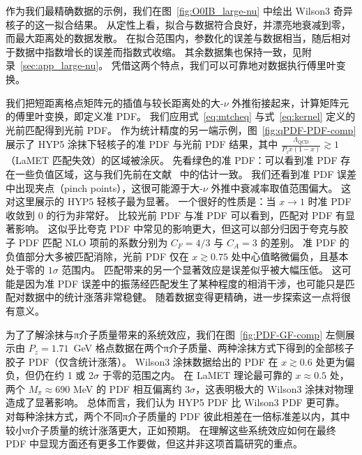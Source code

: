 作为我们最精确数据的示例，我们在图~\ref{fig:O0IB_large-nu} 中绘出 Wilson3 奇异核子的这一拟合结果。
从定性上看，拟合与数据符合良好，并漂亮地衰减到零，而最大距离处的数据发散。
在拟合范围内，参数化的误差与数据相当，随后相对于数据中指数增长的误差而指数式收缩。
其余数据集也保持一致，见附录~\ref{sec:app_large-nu}。
凭借这两个特点，我们可以可靠地对数据执行傅里叶变换。

我们把短距离格点矩阵元的插值与较长距离处的大-$\nu$ 外推衔接起来，计算矩阵元的傅里叶变换，即定义准 PDF。
我们应用式~\ref{eq:mtcheq} 与式~\ref{eq:kernel} 定义的光前匹配得到光前 PDF。
作为统计精度的另一端示例，图~\ref{fig:qPDF-PDF-comp} 展示了 HYP5 涂抹下轻核子的准 PDF 与光前 PDF 结果，其中 $\frac{\Lambda_\text{QCD}}{P_zx(1-x)} \gtrsim 1$（LaMET 匹配失效）的区域被涂灰。
先看绿色的准 PDF：可以看到准 PDF 存在一些负值区域，这与我们先前在文献~\cite{Good:2024iur} 中的估计一致。
我们还看到准 PDF 误差中出现夹点（pinch points），这很可能源于大-$\nu$ 外推中衰减率取值范围偏大。
这对这里展示的 HYP5 轻核子最为显著。
一个很好的性质是：当 $x \rightarrow 1$ 时准 PDF 收敛到 0 的行为非常好。
比较光前 PDF 与准 PDF 可以看到，匹配对 PDF 有显著影响。
这似乎比夸克 PDF 中常见的影响更大，但这可以部分归因于夸克与胶子 PDF 匹配 NLO 项前的系数分别为 $C_F = 4/3$ 与 $C_A = 3$ 的差别。
准 PDF 的负值部分大多被匹配消除，光前 PDF 仅在 $x \gtrsim 0.75$ 处中心值略微偏负，且基本处于零的 $1\sigma$ 范围内。
匹配带来的另一个显著效应是误差似乎被大幅压低。
这可能是因为准 PDF 误差中的振荡经匹配发生了某种程度的相消干涉，也可能只是匹配对数据中的统计涨落非常稳健。
随着数据变得更精确，进一步探索这一点将很有意义。

为了了解涂抹与π介子质量带来的系统效应，我们在图~\ref{fig:PDF-GF-comp} 左侧展示由 $P_z = 1.71$~GeV 格点数据在两个π介子质量、两种涂抹方式下得到的全部核子胶子 PDF（仅含统计涨落）。
Wilson3 涂抹数据给出的 PDF 在 $x \gtrsim 0.6$ 处更为偏负，但仍在约 1 或 2$\sigma$ 于零的范围之内。
在 LaMET 理论最可靠的 $x \approx 0.5$ 处，两个 $M_\pi \approx 690$ MeV 的 PDF 相互偏离约 $3\sigma$，这表明极大的 Wilson3 涂抹对物理造成了显著影响。
总体而言，我们认为 HYP5 PDF 比 Wilson3 PDF 更可靠。
对每种涂抹方式，两个不同π介子质量的 PDF 彼此相差在一倍标准差以内，其中较小π介子质量的统计涨落更大，正如预期。
在理解这些系统效应如何在最终 PDF 中显现方面还有更多工作要做，但这并非这项首篇研究的重点。

